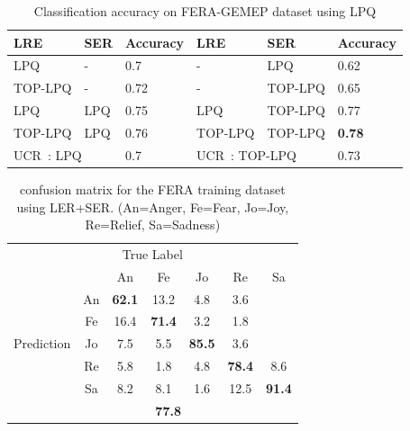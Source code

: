 \documentclass[journal]{IEEEtran}
\begin{document}
\begin{table}[!t]
\caption{Classification accuracy on FERA-GEMEP dataset using LPQ\label{table:comp_lpq}}
\centering
\scriptsize
\begin{tabular}{lll||lll}
\toprule
LRE & SER & Accuracy	& LRE	& SER	& Accuracy \\ \midrule 
LPQ	& -		& 0.7	& - & LPQ & 0.62 \\
TOP-LPQ & - & 0.72 & - & TOP-LPQ & 0.65 \\
LPQ & LPQ & 0.75 & LPQ & TOP-LPQ & 0.77 \\
TOP-LPQ & LPQ & 0.76 & TOP-LPQ & TOP-LPQ & \textbf{0.78} \\ \midrule
\multicolumn{2}{l}{UCR~\cite{Yang_SMCB12}: LPQ} & 0.7 & \multicolumn{2}{l}{UCR~\cite{Yang_SMCB12}: TOP-LPQ} & 0.73 \\
\bottomrule

\end{tabular}
\end{table}




\begin{table}[htbp]
\caption{confusion matrix for the FERA training dataset using LER+SER.
(An=Anger, Fe=Fear, Jo=Joy, Re=Relief, Sa=Sadness)}
\begin{center}
\label{table:mat_fera}
\begin{tabular}{c|c|ccccc}
\multicolumn{7}{c}{True Label} \\ \cline{2-7}
\multirow{7}{*}{\begin{sideways}Prediction\end{sideways}} && An & Fe & Jo & Re & Sa \\ \cline{2-7}
&An				&\textbf{62.1} &13.2  &4.8  &3.6  &   \\ \cline{2-2}
&Fe       &16.4  &\textbf{71.4}  &3.2   &1.8   & \\ \cline{2-2}
&Jo       &7.5  &5.5   &\textbf{85.5} &3.6  &    \\ \cline{2-2}
&Re       &5.8   &1.8   &4.8   &\textbf{78.4} &8.6    \\ \cline{2-2}
&Sa       &8.2   &8.1   &1.6  &12.5 &\textbf{91.4}  \\ \cline{2-2}\hline
\multicolumn{2}{c|}{Average rate} &\multicolumn{5}{c}{\textbf{77.8}} \\

\end{tabular}
\end{center}
\end{table}
\end{document}
